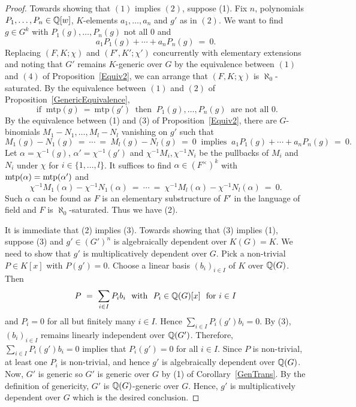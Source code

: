 \begin{proof}

Towards showing that $(1)$ implies $(2)$, suppose (1). Fix $n$, polynomials $P_1, \ldots, P_n \in \mathbb{Q}[w]$, $K$-elements $a_1, \ldots, a_n$ and $g'$ as in $(2)$. 
We want to find $g \in G^{k}$ with $P_1(g), \ldots, P_n(g)$ not all $0$ and  
$$a_1P_1(g) + \cdots+ a_nP_n(g)\ =\ 0.$$
Replacing $(F,K;\chi)$ and $(F',K';\chi')$ concurrently with elementary extensions and noting that $G'$ remains $K$-generic over $G$ by the equivalence between $(1)$ and $(4)$ of Proposition~\ref{Equiv2}, we can arrange that $(F,K;\chi)$ is $\aleph_0$-saturated. By the equivalence between $(1)$ and $(2)$ of Proposition~\ref{GenericEquivalence}, 
$$ \text { if }\ \text{mtp}(g)\ =\ \text{mtp}(g')\ \text{ then }\ P_1(g), \ldots, P_n(g)\ \text{ are not all }0.$$ 
By the equivalence between (1) and (3) of Proposition~\ref{Equiv2}, there are $G$-binomials $M_1-N_1, \ldots, M_l - N_l$ vanishing on $g'$ such that $$M_1(g)-N_1(g)\ =\  \cdots \ =\  M_l(g) - N_l(g) \ =\ 0\ \text{ implies }\ a_1P_1(g) + \cdots+ a_nP_n(g) \ =\ 0.$$
Let $\alpha=\chi^{-1}(g)$, $\alpha'=\chi^{-1}(g')$ and $\chi^{-1}M_i, \chi^{-1}N_i$ be the pullbacks of $M_i$ and $N_i$ under $\chi$ for $i \in  \{1, \ldots,l\}$. 
It suffices to find $\alpha \in (F^\times)^{k}$ with $\mathrm{mtp}(\alpha)=\mathrm{mtp}(\alpha')$ and $$\chi^{-1}M_1(\alpha)-\chi^{-1}N_1(\alpha)\ =\  \cdots\ =\ \chi^{-1}M_l(\alpha)-\chi^{-1}N_l(\alpha)\ =\ 0.$$ Such $\alpha$ can be found as $F$ is an elementary substructure of $F'$ in the language of field and $F$ is $\aleph_0$-saturated. Thus we have (2).

It is immediate that  (2) implies (3). Towards showing that (3) implies (1), suppose (3) and $g' \in (G')^n$ is algebraically dependent over $K(G) =K$. We need to show that $g'$ is multiplicatively dependent over $G$. Pick a non-trivial $P \in K[x]$ with $P(g')=0$. Choose a linear basis $(b_i)_{i\in I}$ of $K$ over $\mathbb{Q}(G)$. Then 
$$P\ =\ \sum_{i \in I} P_ib_i\  \text{ with }\ P_i \in \mathbb{Q}(G)[x]\ \text{ for } i \in I $$ 
and $P_i = 0$ for all but finitely many $i \in I$. 
Hence $\sum_{i \in I} P_i(g')b_i =0 $. By (3), $(b_i)_{i\in I}$ remains linearly independent over $\mathbb{Q}(G')$. Therefore, $\sum_{i \in I} P_i(g')b_i =0 $ implies that $P_i(g')=0$ for all $i \in I$. 
Since $P$ is non-trivial, at least one $P_i$ is non-trivial, and hence $g'$ is algebraically dependent over $\mathbb{Q}(G)$. Now, $G'$ is generic so $G'$ is generic over $G$ by (1) of Corollary~\ref{GenTrans}. By the definition of genericity, $G'$ is $\mathbb{Q}(G)$-generic over $G$.  Hence, $g'$ is multiplicatively dependent over $G$ which is the desired conclusion.
\end{proof}



